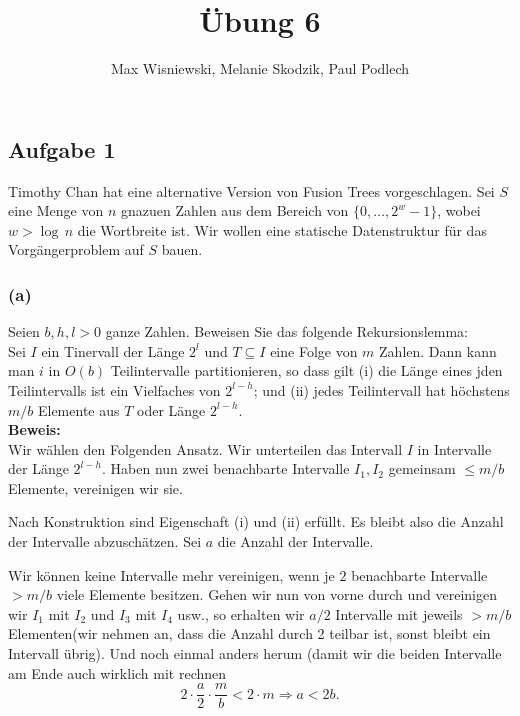 \documentclass[11pt,a4paper,ngerman]{article}
\date{}
\title{Übung 6}
\author{Max Wisniewski, Melanie Skodzik, Paul Podlech}
\begin{document}

\renewcommand{\figurename}{Grafik}

\maketitle
\thispagestyle{fancy}


\subsection*{Aufgabe 1}

Timothy Chan hat eine alternative Version von Fusion Trees vorgeschlagen. Sei $S$ eine Menge von $n$ gnazuen Zahlen aus dem Bereich von $\{0, \ldots, 2^w - 1\}$, wobei $w > \log \, n$ die Wortbreite ist. Wir wollen eine statische Datenstruktur für das Vorgängerproblem auf $S$ bauen.

\subsubsection*{(a)}

Seien $b,h,l > 0$ ganze Zahlen. Beweisen Sie das folgende Rekursionslemma:\\
\noindent Sei $I$ ein Tinervall der Länge $2^l$ und $T \subseteq I$ eine Folge von $m$ Zahlen. Dann kann man $i$ in $O(b)$ Teilintervalle partitionieren, so dass gilt (i) die Länge eines jden Teilintervalls ist ein Vielfaches von $2^{l-h}$; und (ii) jedes Teilintervall hat höchstens $m/b$ Elemente aus $T$ oder Länge $2^{l-h}$.\\

\noindent\textbf{Beweis:}\\

Wir wählen den Folgenden Ansatz. Wir unterteilen das Intervall $I$ in Intervalle der Länge $2^{l-h}$. Haben nun zwei benachbarte Intervalle $I_1, I_2$ gemeinsam $\leq m/b$ Elemente, vereinigen wir sie.

Nach Konstruktion sind Eigenschaft (i) und (ii) erfüllt. Es bleibt also die Anzahl der
Intervalle abzuschätzen. Sei $a$ die Anzahl der Intervalle.

Wir können keine Intervalle mehr vereinigen, wenn je $2$ benachbarte Intervalle $> m/b$ viele Elemente besitzen. Gehen wir nun von vorne durch und vereinigen wir $I_1$ mit $I_2$ und $I_3$ mit $I_4$ usw., so erhalten wir $a/2$ Intervalle mit jeweils $>m/b$ Elementen(wir nehmen an, dass die Anzahl durch 2 teilbar ist, sonst bleibt ein Intervall übrig). Und noch einmal anders herum (damit wir die beiden Intervalle am Ende auch wirklich mit rechnen
$$
   2\cdot\frac{a}{2} \cdot \frac{m}{b} < 2\cdot m \Rightarrow a < 2b.
$$
\end{document}
